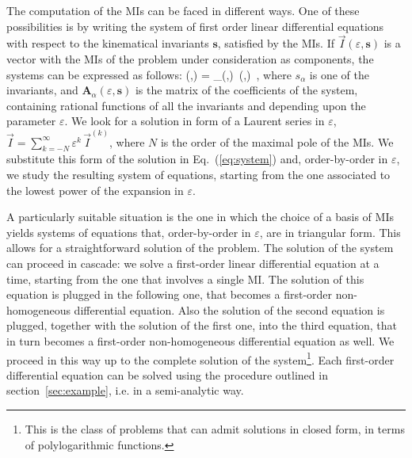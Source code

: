 \documentclass[final,1p,times]{elsarticle}
\begin{document}
The computation of the MIs can be faced in different ways. One of these possibilities is by writing the system of first order linear differential equations with respect to the kinematical invariants $\mathbf{s}$, satisfied by the MIs. If $\vec{I}(\varepsilon,\mathbf{s})$ is a vector with the MIs of the problem under consideration as components, the systems can be expressed as follows:
\be
\label{eq:system}
 (\varepsilon,)
= _\alpha(\varepsilon,)\, (\varepsilon,)\, ,
\ee
where $s_\alpha$ is one of the invariants, 
and $\mathbf{A}_\alpha(\varepsilon,\mathbf{s})$ is the matrix of the coefficients of the system, containing rational functions of all the invariants and depending upon the parameter $\varepsilon$. We look for a solution in form of a Laurent series in $\varepsilon$, $\vec{I}=\sum_{k=-N}^{\infty} \varepsilon^k \, \vec{I}^{(k)}$, where $N$ is the order of the maximal pole of the MIs. We substitute this form of the solution in Eq.~(\ref{eq:system}) and, order-by-order in $\varepsilon$, we study the resulting system of equations, starting from the one associated to the lowest power of the expansion in $\varepsilon$.

A particularly suitable situation is the one in which the choice of a basis of MIs yields systems of equations that, order-by-order in $\varepsilon$, are in triangular form. This allows for a straightforward solution of the problem. The solution of the system can proceed in cascade: we solve a first-order linear differential equation at a time, starting from the one that involves a single MI. The solution of this equation is plugged in the following one, that becomes a first-order non-homogeneous differential equation. Also the solution of the second equation is plugged, together with the solution of the first one, into the third equation, that in turn becomes a first-order non-homogeneous differential equation as well. We proceed in this way up to the complete solution of the system\footnote{This is the class of problems that can admit solutions in closed form, in terms of polylogarithmic functions.}.  
Each first-order differential equation can be solved using the procedure outlined in section~\ref{sec:example}, i.e. in a semi-analytic way.

\end{document}
